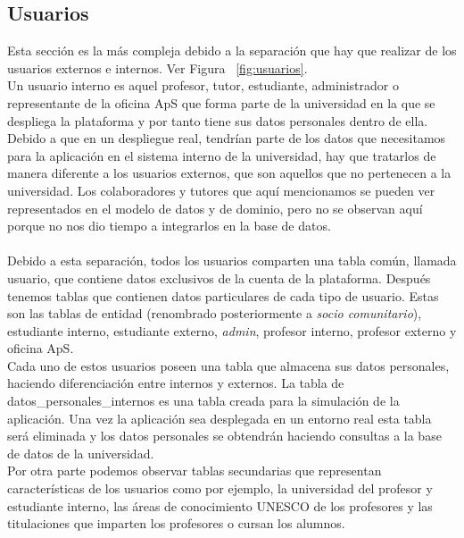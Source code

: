 \documentclass[11pt]{book}
\begin{document}
\subsection{Usuarios}
Esta sección es la más compleja debido a la separación que hay que realizar de los usuarios externos e internos. Ver Figura ~\ref{fig:usuarios}.\\
Un usuario interno es aquel profesor, tutor, estudiante, administrador o representante de la oficina ApS que forma parte de la universidad en la que se despliega la plataforma y por tanto tiene sus datos personales dentro de ella. Debido a que en un despliegue real, tendrían parte de los datos que necesitamos para la aplicación en el sistema interno de la universidad, hay que tratarlos de manera diferente a los usuarios externos, que son aquellos que no pertenecen a la universidad. Los colaboradores y tutores que aquí mencionamos se pueden ver representados en el modelo de datos y de dominio, pero no se observan aquí porque no nos dio tiempo a integrarlos en la base de datos.\\\\
Debido a esta separación, todos los usuarios comparten una tabla común, llamada usuario, que contiene datos exclusivos de la cuenta de la plataforma. Después tenemos tablas que contienen datos particulares de cada tipo de usuario. Estas son las tablas de entidad (renombrado posteriormente a \textit{socio comunitario}), estudiante interno, estudiante externo, \textit{admin}, profesor interno, profesor externo y oficina ApS.\\
Cada uno de estos usuarios poseen una tabla que almacena sus datos personales, haciendo diferenciación entre internos y externos. La tabla de datos\_personales\_internos es una tabla creada para la simulación de la aplicación. Una vez la aplicación sea desplegada en un entorno real esta tabla será eliminada y los datos personales se obtendrán haciendo consultas a la base de datos de la universidad.\\
Por otra parte podemos observar tablas secundarias que representan características de los usuarios como por ejemplo, la universidad del profesor y estudiante interno, las áreas de conocimiento UNESCO de los profesores y las titulaciones que imparten los profesores o cursan los alumnos.
\end{document}

